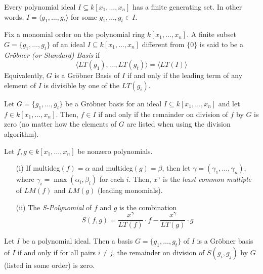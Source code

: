 \begin{theorem}
    Every polynomial ideal $I \subseteq k[x_1, \dots, x_n]$ has a finite generating set.
    In other words, $I = \langle g_1, \dots, g_t \rangle$ for some $g_1, \dots, g_t \in I$.
\end{theorem}

\begin{definition}
    Fix a monomial order on the polynomial ring $k[x_1, \dots, x_n]$.
    A finite subset $G = \{g_1, \dots, g_t \}$ of an ideal $I \subseteq k[x_1, \dots, x_n]$ different from $\{ 0 \}$ is said to be a \textit{Gr\"obner (or Standard) Basis} if
    $$ \langle LT(g_1), \dots, LT(g_t) \rangle = \langle LT(I) \rangle$$
    Equivalently, $G$ is a Gr\"obner Basis of $I$ if and only if the leading term of any element of $I$ is divisible by one of the $LT(g_i)$.
\end{definition}

\begin{proposition}
    Let $G = \{ g_1, \dots, g_t \}$ be a Gr\"obner basis for an ideal $I \subseteq k[x_1, \dots, x_n]$ and let $f \in k[x_1, \dots, x_n]$.
    Then, $f \in I$ if and only if the remainder on division of $f$ by $G$ is zero (no matter how the elements of $G$ are listed when using the division algorithm).
\end{proposition}

\begin{definition}
    Let $f, g \in k[x_1, \dots, x_n]$ be nonzero polynomials.
    \begin{enumerate}
        \item[(i)] If multideg$(f) = \alpha$ and multideg$(g) = \beta$, then let $\gamma = (\gamma_1, \dots, \gamma_n)$, where $\gamma_i = \max(\alpha_i, \beta_i)$ for each $i$.
            Then, $x^{\gamma}$ is the \textit{least common multiple} of $LM(f)$ and $LM(g)$ (leading monomials).
        \item[(ii)] The \textit{S-Polynomial} of $f$ and $g$ is the combination
            $$S(f,g) = \frac{x^{\gamma}}{LT(f)} \cdot f - \frac{x^{\gamma}}{LT(g)} \cdot g$$
    \end{enumerate}
\end{definition}

\begin{theorem}
    Let $I$ be a polynomial ideal.
    Then a basis $G = \{ g_1, \dots, g_t \}$ of $I$ is a Gr\"obner basis of $I$ if and only if for all pairs $i \neq j$, the remainder on division of $S(g_i, g_j)$ by $G$ (listed in some order) is zero.
\end{theorem}

